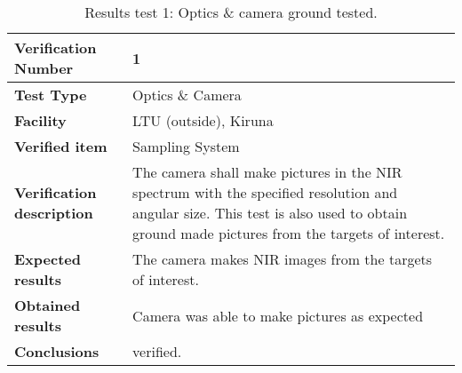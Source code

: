 \begin{table}[H]
\centering

\begin{tabular}{|m{}| m{} |}
\hline
\textbf{Verification Number} 		& 1 					\\ \hline
\textbf{Test Type} 					& Optics \& Camera		\\ \hline
\textbf{Facility} 					& LTU (outside), Kiruna \\ \hline
\textbf{Verified item} 				& Sampling System 		\\ \hline

\textbf{Verification description} 	& The camera shall make pictures in the NIR spectrum with the specified resolution and angular size. This test is also used to obtain ground made pictures from the targets of interest.\\ \hline

\textbf{Expected results} 			& The camera makes NIR images from the targets of interest.\\ \hline

\textbf{Obtained results} 			& Camera was able to make pictures as expected \\ \hline

\textbf{Conclusions} 				&  verified.			\\ \hline
\end{tabular}
\caption{Results test 1: Optics \& camera ground tested.}
\label{tab:testresult1:camera-optics}
\end{table}


\raggedbottom
